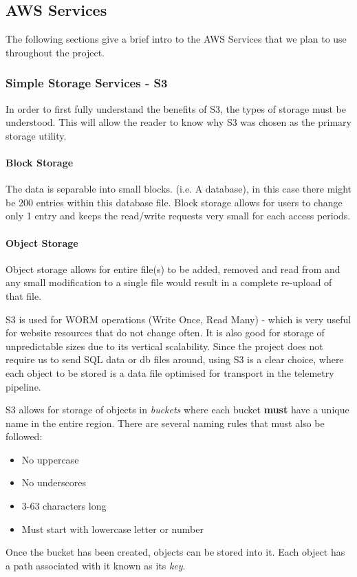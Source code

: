 \subsection{AWS Services}
The following sections give a brief intro to the AWS Services that we plan to use throughout the project.

\subsubsection{Simple Storage Services - S3}
In order to first fully understand the benefits of S3, the types of storage must be understood. This will allow the reader to know why S3 was chosen as the primary storage utility.
\paragraph{Block Storage}
The data is separable into small blocks. (i.e. A database), in this case there might be 200 entries within this database file. Block storage allows for users to change only 1 entry and keeps the read/write requests very small for each access periods.
\paragraph{Object Storage}
Object storage allows for entire file(s) to be added, removed and read from and any small modification to a single file would result in a complete re-upload of that file. 

S3 is used for WORM operations (Write Once, Read Many) - which is very useful for website resources that do not change often. It is also good for storage of unpredictable sizes due to its vertical scalability. Since the project does not require us to send SQL data or db files around, using S3 is a clear choice, where each object to be stored is a data file optimised for transport in the telemetry pipeline. 

S3 allows for storage of objects in \textit{buckets} where each bucket \textbf{must} have a unique name in the entire region. There are several naming rules that must also be followed:
\begin{itemize}
    \item No uppercase
    \item No underscores
    \item 3-63 characters long
    \item Must start with lowercase letter or number
\end{itemize}
Once the bucket has been created, objects can be stored into it. Each object has a path associated with it known as its \textit{key}.

